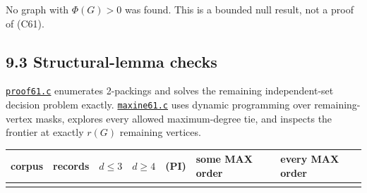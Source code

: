 \documentclass[
  11pt,
  letterpaper,
]{article}
\newcounter{none} %
\begin{document}
No graph with \(\Phi(G)>0\) was found. This is a bounded null result,
not a proof of (C61).

\subsection{9.3 Structural-lemma checks}\label{structural-lemma-checks}

\href{proof61.c}{\texttt{proof61.c}} enumerates 2-packings and solves
the remaining independent-set decision problem exactly.
\href{maxine61.c}{\texttt{maxine61.c}} uses dynamic programming over
remaining-vertex masks, explores every allowed maximum-degree tie, and
inspects the frontier at exactly \(r(G)\) remaining vertices.

{\def\LTcaptype{none} %
\begin{longtable}[]{@{}
  >{\raggedright\arraybackslash}p{}
  >{\raggedleft\arraybackslash}p{}
  >{\raggedleft\arraybackslash}p{}
  >{\raggedleft\arraybackslash}p{}
  >{\raggedleft\arraybackslash}p{}
  >{\raggedleft\arraybackslash}p{}
  >{\raggedleft\arraybackslash}p{}@{}}
\toprule\noalign{}
\begin{minipage}[b]{\linewidth}\raggedright
corpus
\end{minipage} & \begin{minipage}[b]{\linewidth}\raggedleft
records
\end{minipage} & \begin{minipage}[b]{\linewidth}\raggedleft
\(d\le3\)
\end{minipage} & \begin{minipage}[b]{\linewidth}\raggedleft
\(d\ge4\)
\end{minipage} & \begin{minipage}[b]{\linewidth}\raggedleft
(PI)
\end{minipage} & \begin{minipage}[b]{\linewidth}\raggedleft
some MAX order
\end{minipage} & \begin{minipage}[b]{\linewidth}\raggedleft
every MAX order
\end{minipage} \\
\midrule\noalign{}
\endhead
\bottomrule\noalign{}

\end{longtable}}
\end{document}
